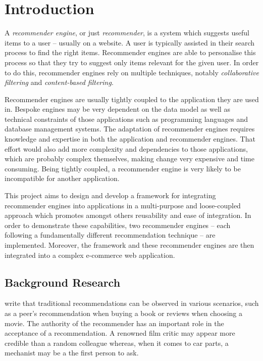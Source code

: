 \chapter{Introduction}

A \emph{recommender engine}, or just \emph{recommender}, is a system which suggests useful items to a user -- usually on a website. A user is typically assisted in their search process to find the right items. Recommender engines are able to personalise this process so that they try to suggest only items relevant for the given user. In order to do this, recommender engines rely on multiple techniques, notably \emph{collaborative filtering} and \emph{content-based filtering}.

Recommender engines are usually tightly coupled to the application they are used in. Bespoke  engines may be very dependent on the data model as well as technical constraints of those applications such as programming languages and database management systems. The adaptation of recommender engines requires knowledge and expertise in both the application and recommender engines. That effort would also add more complexity and dependencies to those applications, which are probably complex themselves, making change very expensive and time consuming. Being tightly coupled, a recommender engine is very likely to be incompatible for another application.

This project aims to design and develop a framework for integrating recommender engines into applications in a multi-purpose and loose-coupled approach which promotes amongst others reusability and ease of integration. In order to demonstrate these capabilities, two recommender engines -- each following a fundamentally different recommendation technique -- are implemented. Moreover, the framework and these recommender engines are then integrated into a complex e-commerce web application.

\section{Background Research}

\citet{ricci11} write that traditional recommendations can be observed in various scenarios, such as a peer's recommendation when buying a book or reviews when choosing a movie. The authority of the recommender has an important role in the acceptance of a recommendation. A renowned film critic may appear more credible than a random colleague whereas, when it comes to car parts, a mechanist may be a the first person to ask.

